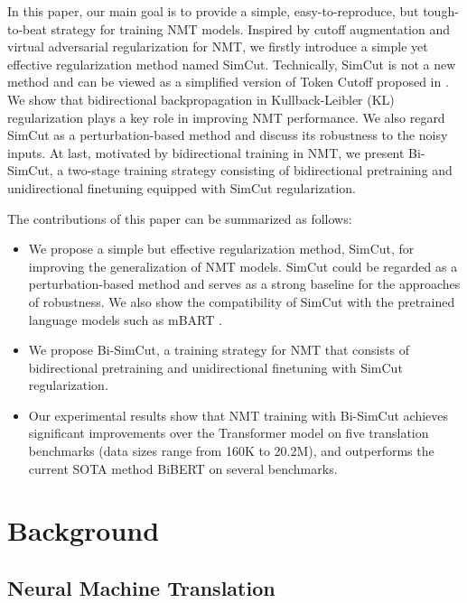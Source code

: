 \documentclass[11pt]{article}
\begin{document}
In this paper, our main goal is to provide a simple, easy-to-reproduce, but tough-to-beat strategy for training NMT models. Inspired by cutoff augmentation \cite{shen2020simple} and virtual adversarial regularization \cite{sano2019effective} for NMT, we firstly introduce a simple yet effective regularization method named SimCut. Technically, SimCut is not a new method and can be viewed as a simplified version of Token Cutoff proposed in \citet{shen2020simple}. We show that bidirectional backpropagation in Kullback-Leibler (KL) regularization plays a key role in improving NMT performance. We also regard SimCut as a perturbation-based method and discuss its robustness to the noisy inputs. At last, motivated by bidirectional training \cite{ding2021improving} in NMT, we present Bi-SimCut, a two-stage training strategy consisting of bidirectional pretraining and unidirectional finetuning equipped with SimCut regularization.

The contributions of this paper can be summarized as follows:
\begin{itemize}
\item We propose a simple but effective regularization method, SimCut, for improving the generalization of NMT models. SimCut could be regarded as a perturbation-based method and serves as a strong baseline for the approaches of robustness. We also show the compatibility of SimCut with the pretrained language models such as mBART \cite{liu2020multilingual}.

\item We propose Bi-SimCut, a training strategy for NMT that consists of bidirectional pretraining and unidirectional finetuning with SimCut regularization.

\item Our experimental results show that NMT training with Bi-SimCut achieves significant improvements over the Transformer model on five translation benchmarks (data sizes range from 160K to 20.2M), and outperforms the current SOTA method BiBERT \cite{xu-etal-2021-bert} on several benchmarks.
\end{itemize}


\section{Background}

\subsection{Neural Machine Translation}
\end{document}
